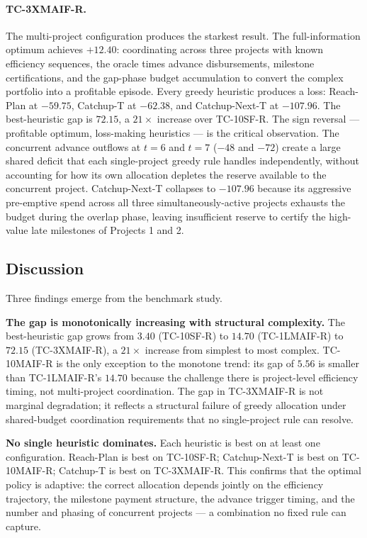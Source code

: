 \paragraph{TC-3XMAIF-R.}
The multi-project configuration produces the starkest result.  The
full-information optimum achieves $+12.40$: coordinating across three
projects with known efficiency sequences, the oracle times advance
disbursements, milestone certifications, and the gap-phase budget
accumulation to convert the complex portfolio into a profitable
episode.  Every greedy heuristic produces a loss: Reach-Plan at
$-59.75$, Catchup-T at $-62.38$, and Catchup-Next-T at $-107.96$.
The best-heuristic gap is $72.15$, a $21\times$ increase over
TC-10SF-R.  The sign reversal --- profitable optimum, loss-making
heuristics --- is the critical observation.  The concurrent advance
outflows at $t = 6$ and $t = 7$ ($-48$ and $-72$) create a large
shared deficit that each single-project greedy rule handles
independently, without accounting for how its own allocation depletes
the reserve available to the concurrent project.  Catchup-Next-T
collapses to $-107.96$ because its aggressive pre-emptive spend across
all three simultaneously-active projects exhausts the budget during the
overlap phase, leaving insufficient reserve to certify the high-value
late milestones of Projects 1 and 2.

\subsection{Discussion}
\label{subsec:discussion}

Three findings emerge from the benchmark study.

\textbf{The gap is monotonically increasing with structural complexity.}
The best-heuristic gap grows from $3.40$ (TC-10SF-R) to $14.70$
(TC-1LMAIF-R) to $72.15$ (TC-3XMAIF-R), a $21\times$ increase from
simplest to most complex.  TC-10MAIF-R is the only exception to the
monotone trend: its gap of $5.56$ is smaller than TC-1LMAIF-R's
$14.70$ because the challenge there is project-level efficiency timing,
not multi-project coordination.  The gap in TC-3XMAIF-R is not
marginal degradation; it reflects a structural failure of greedy
allocation under shared-budget coordination requirements that no
single-project rule can resolve.

\textbf{No single heuristic dominates.}
Each heuristic is best on at least one configuration.
Reach-Plan is best on TC-10SF-R; Catchup-Next-T is best on
TC-10MAIF-R; Catchup-T is best on TC-3XMAIF-R.  This confirms that
the optimal policy is adaptive: the correct allocation depends jointly
on the efficiency trajectory, the milestone payment structure, the
advance trigger timing, and the number and phasing of concurrent
projects --- a combination no fixed rule can capture.

